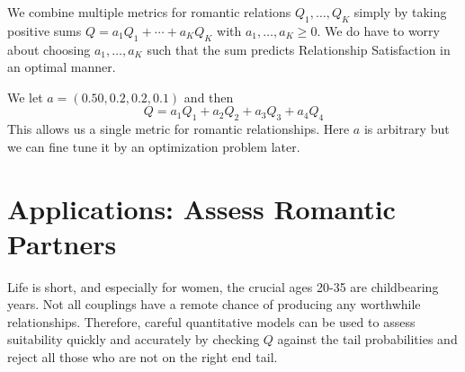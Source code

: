\documentclass{article}
\begin{document}
We combine multiple metrics for romantic relations $Q_1, \dots, Q_K$ simply by taking positive sums $Q = a_1 Q_1 + \cdots + a_K Q_K$ with $a_1, \dots, a_K \ge 0$.  We do have to worry about choosing $a_1, \dots, a_K$ such that the sum predicts Relationship Satisfaction in an optimal manner.  

We let $a = ( 0.50, 0.2, 0.2, 0.1)$ and then 
\[
Q = a_1 Q_1 + a_2 Q_2 + a_3 Q_3 + a_4 Q_4
\]
This allows us a single metric for romantic relationships.  Here $a$ is arbitrary but we can fine tune it by an optimization problem later.  

\section{Applications:  Assess Romantic Partners}
Life is short, and especially for women, the crucial ages 20-35 are childbearing years.  Not all couplings have a remote chance of producing any worthwhile relationships.  Therefore, careful quantitative models can be used to assess suitability quickly and accurately by checking $Q$ against the tail probabilities and reject all those who are not on the right end tail. 
\end{document}
